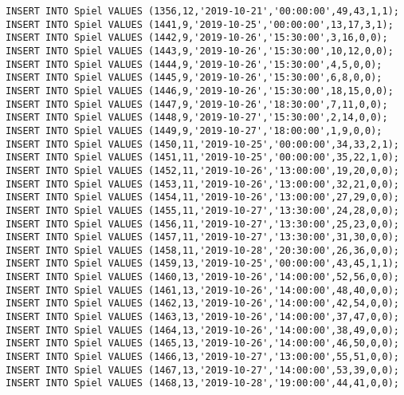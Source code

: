 \documentclass{bschlangaul-aufgabe}
\begin{document}
\begin{verbatim}
INSERT INTO Spiel VALUES (1356,12,'2019-10-21','00:00:00',49,43,1,1);
INSERT INTO Spiel VALUES (1441,9,'2019-10-25','00:00:00',13,17,3,1);
INSERT INTO Spiel VALUES (1442,9,'2019-10-26','15:30:00',3,16,0,0);
INSERT INTO Spiel VALUES (1443,9,'2019-10-26','15:30:00',10,12,0,0);
INSERT INTO Spiel VALUES (1444,9,'2019-10-26','15:30:00',4,5,0,0);
INSERT INTO Spiel VALUES (1445,9,'2019-10-26','15:30:00',6,8,0,0);
INSERT INTO Spiel VALUES (1446,9,'2019-10-26','15:30:00',18,15,0,0);
INSERT INTO Spiel VALUES (1447,9,'2019-10-26','18:30:00',7,11,0,0);
INSERT INTO Spiel VALUES (1448,9,'2019-10-27','15:30:00',2,14,0,0);
INSERT INTO Spiel VALUES (1449,9,'2019-10-27','18:00:00',1,9,0,0);
INSERT INTO Spiel VALUES (1450,11,'2019-10-25','00:00:00',34,33,2,1);
INSERT INTO Spiel VALUES (1451,11,'2019-10-25','00:00:00',35,22,1,0);
INSERT INTO Spiel VALUES (1452,11,'2019-10-26','13:00:00',19,20,0,0);
INSERT INTO Spiel VALUES (1453,11,'2019-10-26','13:00:00',32,21,0,0);
INSERT INTO Spiel VALUES (1454,11,'2019-10-26','13:00:00',27,29,0,0);
INSERT INTO Spiel VALUES (1455,11,'2019-10-27','13:30:00',24,28,0,0);
INSERT INTO Spiel VALUES (1456,11,'2019-10-27','13:30:00',25,23,0,0);
INSERT INTO Spiel VALUES (1457,11,'2019-10-27','13:30:00',31,30,0,0);
INSERT INTO Spiel VALUES (1458,11,'2019-10-28','20:30:00',26,36,0,0);
INSERT INTO Spiel VALUES (1459,13,'2019-10-25','00:00:00',43,45,1,1);
INSERT INTO Spiel VALUES (1460,13,'2019-10-26','14:00:00',52,56,0,0);
INSERT INTO Spiel VALUES (1461,13,'2019-10-26','14:00:00',48,40,0,0);
INSERT INTO Spiel VALUES (1462,13,'2019-10-26','14:00:00',42,54,0,0);
INSERT INTO Spiel VALUES (1463,13,'2019-10-26','14:00:00',37,47,0,0);
INSERT INTO Spiel VALUES (1464,13,'2019-10-26','14:00:00',38,49,0,0);
INSERT INTO Spiel VALUES (1465,13,'2019-10-26','14:00:00',46,50,0,0);
INSERT INTO Spiel VALUES (1466,13,'2019-10-27','13:00:00',55,51,0,0);
INSERT INTO Spiel VALUES (1467,13,'2019-10-27','14:00:00',53,39,0,0);
INSERT INTO Spiel VALUES (1468,13,'2019-10-28','19:00:00',44,41,0,0);


\end{verbatim}
\end{document}
